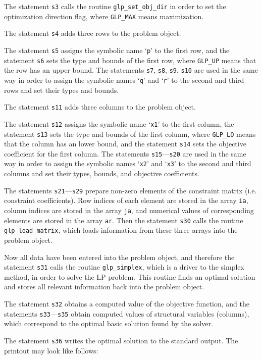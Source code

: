 The statement \verb|s3| calls the routine \verb|glp_set_obj_dir| in
order to set the optimization direction flag, where \verb|GLP_MAX| means
maximization.

The statement \verb|s4| adds three rows to the problem object.

The statement \verb|s5| assigns the symbolic name `\verb|p|' to the
first row, and the statement \verb|s6| sets the type and bounds of the
first row, where \verb|GLP_UP| means that the row has an upper bound.
The statements \verb|s7|, \verb|s8|, \verb|s9|, \verb|s10| are used in
the same way in order to assign the symbolic names `\verb|q|' and
`\verb|r|' to the second and third rows and set their types and bounds.

The statement \verb|s11| adds three columns to the problem object.

The statement \verb|s12| assigns the symbolic name `\verb|x1|' to the
first column, the statement \verb|s13| sets the type and bounds of the
first column, where \verb|GLP_LO| means that the column has an lower
bound, and the statement \verb|s14| sets the objective coefficient for
the first column. The statements \verb|s15|---\verb|s20| are used in the
same way in order to assign the symbolic names `\verb|x2|' and
`\verb|x3|' to the second and third columns and set their types, bounds,
and objective coefficients.

The statements \verb|s21|---\verb|s29| prepare non-zero elements of the
constraint matrix (i.e. constraint coefficients). Row indices of each
element are stored in the array \verb|ia|, column indices are stored in
the array \verb|ja|, and numerical values of corresponding elements are
stored in the array \verb|ar|. Then the statement \verb|s30| calls
the routine \verb|glp_load_matrix|, which loads information from these
three arrays into the problem object.

Now all data have been entered into the problem object, and therefore
the statement \verb|s31| calls the routine \verb|glp_simplex|, which is
a driver to the simplex method, in order to solve the LP problem. This
routine finds an optimal solution and stores all relevant information
back into the problem object.

The statement \verb|s32| obtains a computed value of the objective
function, and the statements \verb|s33|---\verb|s35| obtain computed
values of structural variables (columns), which correspond to the
optimal basic solution found by the solver.

The statement \verb|s36| writes the optimal solution to the standard
output. The printout may look like follows:

